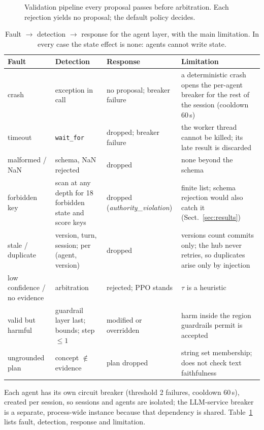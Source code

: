 \begin{figure}[tbp]
\centering
\resizebox{\textwidth}{!}{}
\caption{Validation pipeline every proposal passes before arbitration. Each rejection yields no proposal; the default policy decides.}\label{fig:valid}
\end{figure}
\begin{table}[tbp]
\centering\footnotesize
\caption{Fault $\rightarrow$ detection $\rightarrow$ response for the agent layer, with the main limitation. In every case the state effect is none: agents cannot write state.}\label{tab:faults}
\begin{tabular}{>{\raggedright\arraybackslash}p{1.9cm}>{\raggedright\arraybackslash}p{2.7cm}>{\raggedright\arraybackslash}p{2.5cm}>{\raggedright\arraybackslash}p{4.3cm}}
\toprule
Fault & Detection & Response & Limitation\\
\midrule
crash & exception in call & no proposal; breaker failure & a deterministic crash opens the per-agent breaker for the rest of the session (cooldown 60\,s)\\
timeout & \texttt{wait\_for} & dropped; breaker failure & the worker thread cannot be killed; its late result is discarded\\
malformed / NaN & schema, NaN rejected & dropped & none beyond the schema\\
forbidden key & scan at any depth for 18 forbidden state and score keys & dropped (\emph{authority\_violation}) & finite list; schema rejection would also catch it (Sect.~\ref{sec:results})\\
stale / duplicate & version, turn, session; per (agent, version) & dropped & versions count commits only; the hub never retries, so duplicates arise only by injection\\
low confidence / no evidence & arbitration & rejected; PPO stands & $\tau$ is a heuristic\\
valid but harmful & guardrail layer last; bounds; step $\le1$ & modified or overridden & harm inside the region guardrails permit is accepted\\
ungrounded plan & concept $\notin$ evidence & plan dropped & string set membership; does not check text faithfulness\\
\bottomrule
\end{tabular}
\end{table}
Each agent has its own circuit breaker (threshold 2 failures, cooldown 60\,s), created per session, so sessions and agents are isolated; the LLM-service breaker is a separate, process-wide instance because that dependency is shared. Table~\ref{tab:faults} lists fault, detection, response and limitation.
